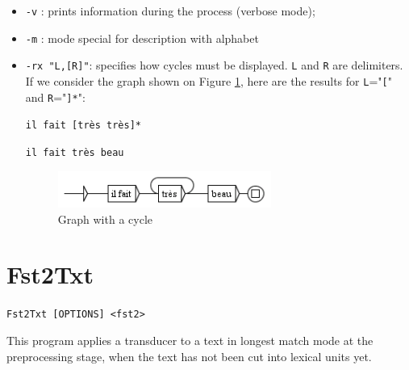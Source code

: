 \begin{itemize}
  \item \verb$-v$ : prints information during the process (verbose mode);
  
  \item \verb$-m$ : mode special for description with alphabet
  \item \verb$-rx "L,[R]"$: specifies how cycles must be displayed. \verb$L$ and
  \verb$R$ are delimiters. If we consider the graph shown on Figure \ref{cycle},
  here are the results for \verb$L$="\verb$[$" and \verb$R$="\verb$]*$":

  \medskip
  \noindent
  \texttt{il fait [tr\`es tr\`es]*}
  
  \noindent
  \texttt{il fait tr\`es beau}

\begin{figure}[h]
\begin{center}
\includegraphics[width=7cm]{resources/img/fig10-1.png}
\caption{Graph with a cycle\label{cycle}}
\end{center}
\end{figure}

\end{itemize}







\section{Fst2Txt}
\verb+Fst2Txt [OPTIONS] <fst2>+

\bigskip
\noindent This program applies a transducer to a text in longest match mode at the
preprocessing stage, when the text has not been cut into lexical units yet.

